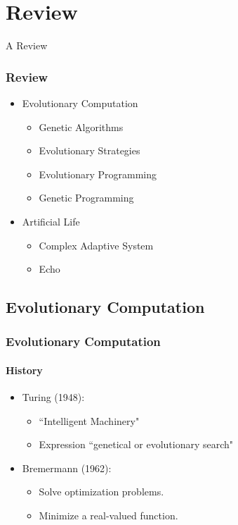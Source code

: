 \section{Review}

\frame
{
	\begin{center}
		\LARGE A Review
	\end{center}
}

\frame
{
	\frametitle{Review}
	
	\begin{itemize}
		\item Evolutionary Computation
			\begin{itemize}
				\item Genetic Algorithms
				\item Evolutionary Strategies
				\item Evolutionary Programming
				\item Genetic Programming
			\end{itemize}
		\item Artificial Life
			\begin{itemize}
				\item Complex Adaptive System
				\item Echo
			\end{itemize}
	\end{itemize}
}

\subsection{Evolutionary Computation}

\frame
{
	\frametitle{Evolutionary Computation}
	\framesubtitle{History}
	
	\begin{itemize}
		\item Turing (1948):
			\begin{itemize}
				\item ``Intelligent Machinery"
				\item Expression ``genetical or evolutionary search"
			\end{itemize}
		\item Bremermann (1962):
			\begin{itemize}
				\item Solve optimization problems.
				\item Minimize a real-valued function.
			\end{itemize}
	\end{itemize}	
}


